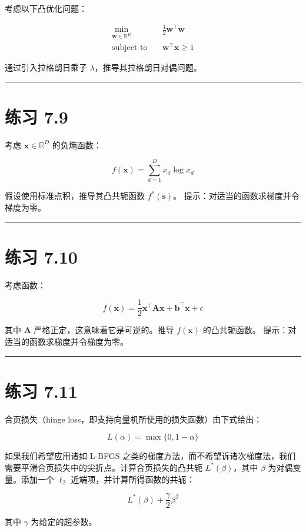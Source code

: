 考虑以下凸优化问题：

\begin{equation*}
\begin{aligned}
\min_{\boldsymbol{w} \in \mathbb{R}^D} \quad & \frac{1}{2}\boldsymbol{w}^\top \boldsymbol{w} \\
\text{subject to} \quad & \boldsymbol{w}^\top \boldsymbol{x} \geqslant 1
\end{aligned}
\end{equation*}

通过引入拉格朗日乘子 $ \lambda $，推导其拉格朗日对偶问题。

\medskip\hrule\medskip

\section*{练习 7.9}

考虑 $ \boldsymbol{x} \in \mathbb{R}^D $ 的负熵函数：

\begin{equation*}
f(\boldsymbol{x}) = \sum_{d=1}^D x_d \log x_d
\end{equation*}

假设使用标准点积，推导其凸共轭函数 $ f^*(\boldsymbol{s}) $。 提示：对适当的函数求梯度并令梯度为零。

\medskip\hrule\medskip

\section*{练习 7.10}

考虑函数：

\begin{equation*}
f(\boldsymbol{x}) = \frac{1}{2}\boldsymbol{x}^\top \boldsymbol{A} \boldsymbol{x} + \boldsymbol{b}^\top \boldsymbol{x} + c
\end{equation*}

其中 $ \boldsymbol{A} $ 严格正定，这意味着它是可逆的。推导 $ f(\boldsymbol{x}) $ 的凸共轭函数。 提示：对适当的函数求梯度并令梯度为零。

\medskip\hrule\medskip

\section*{练习 7.11}

合页损失（hinge loss，即支持向量机所使用的损失函数）由下式给出：

\begin{equation*}
L(\alpha) = \max\{0, 1 - \alpha\}
\end{equation*}

如果我们希望应用诸如 L-BFGS 之类的梯度方法，而不希望诉诸次梯度法，我们需要平滑合页损失中的尖折点。计算合页损失的凸共轭 $ L^*(\beta) $，其中 $ \beta $ 为对偶变量。添加一个 $ \ell_2 $ 近端项，并计算所得函数的共轭：

\begin{equation*}
L^*(\beta) + \frac{\gamma}{2}\beta^2
\end{equation*}

其中 $ \gamma $ 为给定的超参数。
